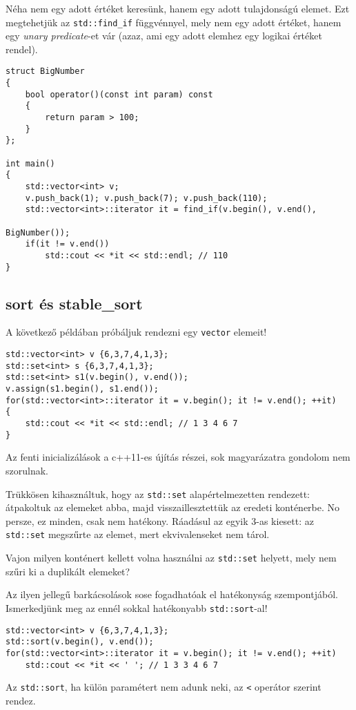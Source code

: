 \documentclass[a4paper,11.5pt,table]{article}
\begin{document}
	\medskip
	Néha nem egy adott értéket keresünk, hanem egy adott tulajdonságú elemet. Ezt megtehetjük az \texttt{std::find\_if} függvénnyel, mely nem egy adott értéket, hanem egy \textit{unary predicate}-et vár (azaz, ami egy adott elemhez egy logikai értéket rendel).
	\begin{lstlisting}
struct BigNumber
{
	bool operator()(const int param) const
	{
		return param > 100;
	}
};

int main()
{
	std::vector<int> v;
	v.push_back(1);	v.push_back(7);	v.push_back(110);
	std::vector<int>::iterator it = find_if(v.begin(), v.end(),
															   BigNumber());
	if(it != v.end())
		std::cout << *it << std::endl; // 110
}
	\end{lstlisting}
	\subsection{sort és stable\_sort}
	A következő példában próbáljuk rendezni egy \texttt{vector} elemeit!
	\begin{lstlisting}
std::vector<int> v {6,3,7,4,1,3};
std::set<int> s {6,3,7,4,1,3};
std::set<int> s1(v.begin(), v.end());
v.assign(s1.begin(), s1.end());
for(std::vector<int>::iterator it = v.begin(); it != v.end(); ++it)
{
	std::cout << *it << std::endl; // 1 3 4 6 7 
}
	\end{lstlisting}
%	
	\begin{note}
		Az fenti inicializálások a c++11-es újítás részei, sok magyarázatra gondolom nem szorulnak.
	\end{note}
	Trükkösen kihasználtuk, hogy az \texttt{std::set} alapértelmezetten rendezett: átpakoltuk az elemeket abba, majd visszaillesztettük az eredeti konténerbe. No persze, ez minden, csak nem hatékony. Ráadásul az egyik 3-as kiesett: az \texttt{std::set} megszűrte az elemet, mert ekvivalenseket nem tárol.
	\begin{note}
		Vajon milyen konténert kellett volna használni az \texttt{std::set} helyett, mely nem szűri ki a duplikált elemeket?
	\end{note}
	Az ilyen jellegű barkácsolások sose fogadhatóak el hatékonyság szempontjából. Ismerkedjünk meg az ennél sokkal hatékonyabb \texttt{std::sort}-al!
	\begin{lstlisting}
std::vector<int> v {6,3,7,4,1,3};
std::sort(v.begin(), v.end());
for(std::vector<int>::iterator it = v.begin(); it != v.end(); ++it)
	std::cout << *it << ' '; // 1 3 3 4 6 7
	\end{lstlisting}
	Az \texttt{std::sort}, ha külön paramétert nem adunk neki, az \texttt{<} operátor szerint rendez.
	
\end{document}
